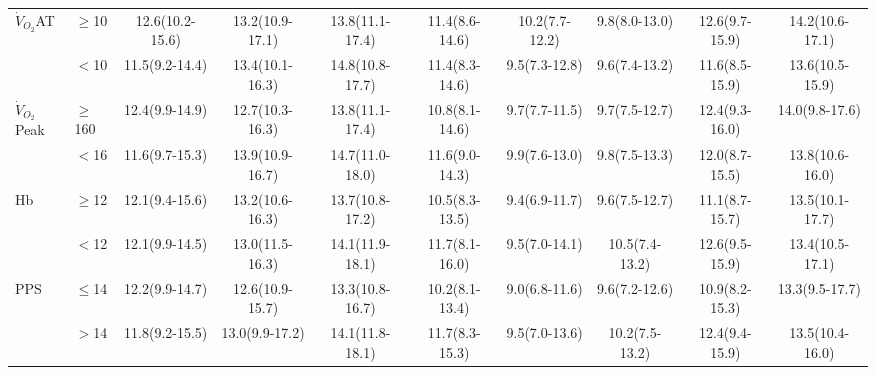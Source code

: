 \begin{sidewaystable}[p]
\begin{tabular}{|l l | cc cc cc cc|}
		$\dot{V}_{O_2}$AT   & $\geq$10  & 12.6(10.2-15.6) & 13.2(10.9-17.1) & 13.8(11.1-17.4) & 11.4(8.6-14.6) & 10.2(7.7-12.2) & 9.8(8.0-13.0)  & 12.6(9.7-15.9)  & 14.2(10.6-17.1) \\
		                    & $<$10     & 11.5(9.2-14.4)  & 13.4(10.1-16.3) & 14.8(10.8-17.7) & 11.4(8.3-14.6) & 9.5(7.3-12.8)  & 9.6(7.4-13.2)  & 11.6(8.5-15.9)  & 13.6(10.5-15.9) \\
		$\dot{V}_{O_2}$Peak & $\geq$160 & 12.4(9.9-14.9)  & 12.7(10.3-16.3) & 13.8(11.1-17.4) & 10.8(8.1-14.6) & 9.7(7.7-11.5)  & 9.7(7.5-12.7)  & 12.4(9.3-16.0)  & 14.0(9.8-17.6)  \\
		                    & $<$16     & 11.6(9.7-15.3)  & 13.9(10.9-16.7) & 14.7(11.0-18.0) & 11.6(9.0-14.3) & 9.9(7.6-13.0)  & 9.8(7.5-13.3)  & 12.0(8.7-15.5)  & 13.8(10.6-16.0) \\
		Hb                  & $\geq$12  & 12.1(9.4-15.6)  & 13.2(10.6-16.3) & 13.7(10.8-17.2) & 10.5(8.3-13.5) & 9.4(6.9-11.7)  & 9.6(7.5-12.7)  & 11.1(8.7-15.7)  & 13.5(10.1-17.7) \\
		                    & $<$12     & 12.1(9.9-14.5)  & 13.0(11.5-16.3) & 14.1(11.9-18.1) & 11.7(8.1-16.0) & 9.5(7.0-14.1)  & 10.5(7.4-13.2) & 12.6(9.5-15.9)  & 13.4(10.5-17.1) \\
		PPS                 & $\leq$14  & 12.2(9.9-14.7)  & 12.6(10.9-15.7) & 13.3(10.8-16.7) & 10.2(8.1-13.4) & 9.0(6.8-11.6)  & 9.6(7.2-12.6)  & 10.9(8.2-15.3)  & 13.3(9.5-17.7)  \\
		                    & $>$14     & 11.8(9.2-15.5)  & 13.0(9.9-17.2)  & 14.1(11.8-18.1) & 11.7(8.3-15.3) & 9.5(7.0-13.6)  & 10.2(7.5-13.2) & 12.4(9.4-15.9)  & 13.5(10.4-16.0) \\ \hline
	\end{tabular}	
\end{sidewaystable}

  




